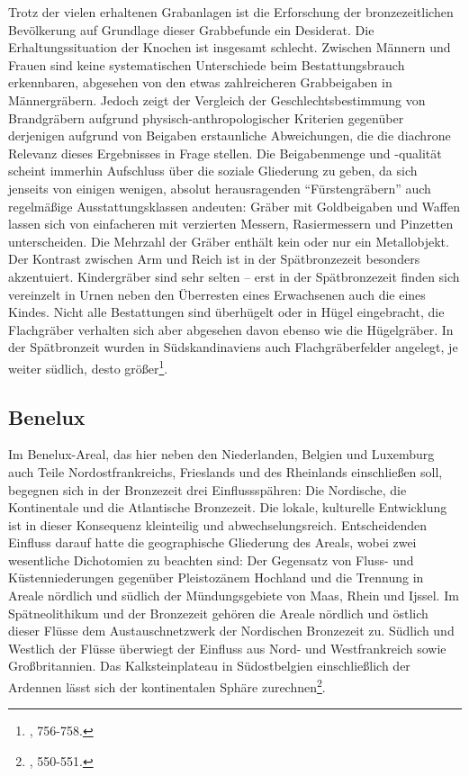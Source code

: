 \documentclass[openany,twoside,twocolumn]{book}
\let\rmarkdownfootnote\footnote%
\def\footnote{\protect\rmarkdownfootnote}
\begin{document}
Trotz der vielen erhaltenen Grabanlagen ist die Erforschung der
bronzezeitlichen Bevölkerung auf Grundlage dieser Grabbefunde ein
Desiderat. Die Erhaltungssituation der Knochen ist insgesamt schlecht.
Zwischen Männern und Frauen sind keine systematischen Unterschiede beim
Bestattungsbrauch erkennbaren, abgesehen von den etwas zahlreicheren
Grabbeigaben in Männergräbern. Jedoch zeigt der Vergleich der
Geschlechtsbestimmung von Brandgräbern aufgrund
physisch-anthropologischer Kriterien gegenüber derjenigen aufgrund von
Beigaben erstaunliche Abweichungen, die die diachrone Relevanz dieses
Ergebnisses in Frage stellen. Die Beigabenmenge und -qualität scheint
immerhin Aufschluss über die soziale Gliederung zu geben, da sich
jenseits von einigen wenigen, absolut herausragenden ``Fürstengräbern''
auch regelmäßige Ausstattungsklassen andeuten: Gräber mit Goldbeigaben
und Waffen lassen sich von einfacheren mit verzierten Messern,
Rasiermessern und Pinzetten unterscheiden. Die Mehrzahl der Gräber
enthält kein oder nur ein Metallobjekt. Der Kontrast zwischen Arm und
Reich ist in der Spätbronzezeit besonders akzentuiert. Kindergräber sind
sehr selten -- erst in der Spätbronzezeit finden sich vereinzelt in
Urnen neben den Überresten eines Erwachsenen auch die eines Kindes.
Nicht alle Bestattungen sind überhügelt oder in Hügel eingebracht, die
Flachgräber verhalten sich aber abgesehen davon ebenso wie die
Hügelgräber. In der Spätbronzeit wurden in Südskandinaviens auch
Flachgräberfelder angelegt, je weiter südlich, desto größer\footnote{\textcite{thrane_scandinavia_2013},
  756-758.}.

\hypertarget{benelux}{%
\subsection{Benelux}\label{benelux}}

Im Benelux-Areal, das hier neben den Niederlanden, Belgien und Luxemburg
auch Teile Nordostfrankreichs, Frieslands und des Rheinlands
einschließen soll, begegnen sich in der Bronzezeit drei Einflussspähren:
Die Nordische, die Kontinentale und die Atlantische Bronzezeit. Die
lokale, kulturelle Entwicklung ist in dieser Konsequenz kleinteilig und
abwechselungsreich. Entscheidenden Einfluss darauf hatte die
geographische Gliederung des Areals, wobei zwei wesentliche Dichotomien
zu beachten sind: Der Gegensatz von Fluss- und Küstenniederungen
gegenüber Pleistozänem Hochland und die Trennung in Areale nördlich und
südlich der Mündungsgebiete von Maas, Rhein und Ijssel. Im
Spätneolithikum und der Bronzezeit gehören die Areale nördlich und
östlich dieser Flüsse dem Austauschnetzwerk der Nordischen Bronzezeit
zu. Südlich und Westlich der Flüsse überwiegt der Einfluss aus Nord- und
Westfrankreich sowie Großbritannien. Das Kalksteinplateau in
Südostbelgien einschließlich der Ardennen lässt sich der kontinentalen
Sphäre zurechnen\footnote{\textcite{fokkens_bronze_2013}, 550-551.}.
\end{document}
